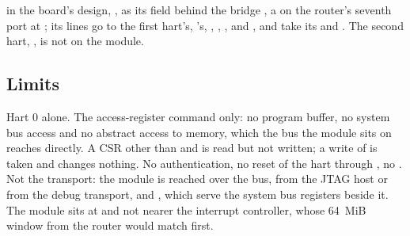  in the board's design, , as its field
 behind the bridge , a  on the
router's seventh port at ; its lines go to the
first hart's, 's, , ,
,  and , and take its
 and . The second hart, , is
not on the module.

\subsection*{Limits}

Hart 0 alone. The access-register command only: no program buffer, no
system bus access and no abstract access to memory, which the bus the
module sits on reaches directly. A CSR other than  and
 is read but not written; a write of  is
taken and changes nothing. No authentication, no reset of
the hart through , no . Not the transport:
the module is reached over the bus, from the JTAG host or from the
debug transport,  and , which serve the
system bus registers beside it. The module sits at
 and not nearer the interrupt controller, whose
64~MiB window from  the router would match first.
